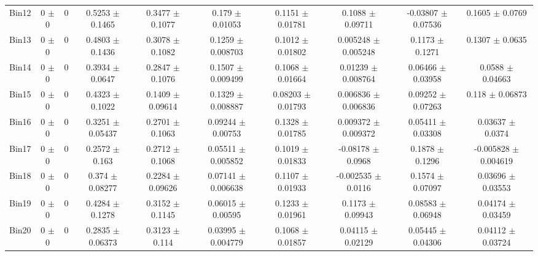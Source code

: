 \begin{tabular}{@{\extracolsep{4pt}}lccccccccc@{}}
     Bin12 & 0 $\pm$ 0 & 0 & 0.5253 $\pm$ 0.1465 & 0.3477 $\pm$ 0.1077 & 0.179 $\pm$ 0.01053 & 0.1151 $\pm$ 0.01781 & 0.1088 $\pm$ 0.09711 & -0.03807 $\pm$ 0.07536 & 0.1605 $\pm$ 0.0769 \\ 
     Bin13 & 0 $\pm$ 0 & 0 & 0.4803 $\pm$ 0.1436 & 0.3078 $\pm$ 0.1082 & 0.1259 $\pm$ 0.008703 & 0.1012 $\pm$ 0.01802 & 0.005248 $\pm$ 0.005248 & 0.1173 $\pm$ 0.1271 & 0.1307 $\pm$ 0.0635 \\ 
     Bin14 & 0 $\pm$ 0 & 0 & 0.3934 $\pm$ 0.0647 & 0.2847 $\pm$ 0.1076 & 0.1507 $\pm$ 0.009499 & 0.1068 $\pm$ 0.01664 & 0.01239 $\pm$ 0.008764 & 0.06466 $\pm$ 0.03958 & 0.0588 $\pm$ 0.04663 \\ 
     Bin15 & 0 $\pm$ 0 & 0 & 0.4323 $\pm$ 0.1022 & 0.1409 $\pm$ 0.09614 & 0.1329 $\pm$ 0.008887 & 0.08203 $\pm$ 0.01793 & 0.006836 $\pm$ 0.006836 & 0.09252 $\pm$ 0.07263 & 0.118 $\pm$ 0.06873 \\ 
     Bin16 & 0 $\pm$ 0 & 0 & 0.3251 $\pm$ 0.05437 & 0.2701 $\pm$ 0.1063 & 0.09244 $\pm$ 0.00753 & 0.1328 $\pm$ 0.01785 & 0.009372 $\pm$ 0.009372 & 0.05411 $\pm$ 0.03308 & 0.03637 $\pm$ 0.0374 \\ 
     Bin17 & 0 $\pm$ 0 & 0 & 0.2572 $\pm$ 0.163 & 0.2712 $\pm$ 0.1068 & 0.05511 $\pm$ 0.005852 & 0.1019 $\pm$ 0.01833 & -0.08178 $\pm$ 0.0968 & 0.1878 $\pm$ 0.1296 & -0.005828 $\pm$ 0.004619 \\ 
     Bin18 & 0 $\pm$ 0 & 0 & 0.374 $\pm$ 0.08277 & 0.2284 $\pm$ 0.09626 & 0.07141 $\pm$ 0.006638 & 0.1107 $\pm$ 0.01933 & -0.002535 $\pm$ 0.0116 & 0.1574 $\pm$ 0.07097 & 0.03696 $\pm$ 0.03553 \\ 
     Bin19 & 0 $\pm$ 0 & 0 & 0.4284 $\pm$ 0.1278 & 0.3152 $\pm$ 0.1145 & 0.06015 $\pm$ 0.00595 & 0.1233 $\pm$ 0.01961 & 0.1173 $\pm$ 0.09943 & 0.08583 $\pm$ 0.06948 & 0.04174 $\pm$ 0.03459 \\ 
     Bin20 & 0 $\pm$ 0 & 0 & 0.2835 $\pm$ 0.06373 & 0.3123 $\pm$ 0.114 & 0.03995 $\pm$ 0.004779 & 0.1068 $\pm$ 0.01857 & 0.04115 $\pm$ 0.02129 & 0.05445 $\pm$ 0.04306 & 0.04112 $\pm$ 0.03724 \\ 
\hline\hline
  \end{tabular}
